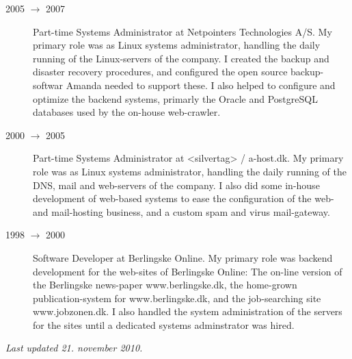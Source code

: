 \documentclass[margin,line,a4paper]{resume}
\begin{document}
\begin{resume}
\begin{description}
\item[2005 $\rightarrow$ 2007] Part-time Systems Administrator at Netpointers
Technologies A/S. My primary role was as Linux systems administrator, handling
the daily running of the Linux-servers of the company. I created the backup
and disaster recovery procedures, and configured the open source
backup-softwar Amanda needed to support these. I also helped to configure and
optimize the backend systems, primarly the Oracle and PostgreSQL databases
used by the on-house web-crawler.


\item[2000 $\rightarrow$ 2005] Part-time Systems Administrator at <silvertag>
/ a-host.dk. My primary role was as Linux systems administrator, handling the
daily running of the DNS, mail and web-servers of the company. I also did some
in-house development of web-based systems to ease the configuration of the
web- and mail-hosting business, and a custom spam and virus
mail-gateway.

\item[1998 $\rightarrow$ 2000] Software Developer at Berlingske Online. 
My primary role was backend development for the web-sites of Berlingske
Online: The on-line version of the Berlingske news-paper www.berlingske.dk,
the home-grown publication-system for www.berlingske.dk, and the job-searching
site www.jobzonen.dk. I also handled the system administration of the servers
for the sites until a dedicated systems adminstrator was hired.
\end{description}


{\em Last updated 21. november 2010.}
\end{resume}
\end{document}
